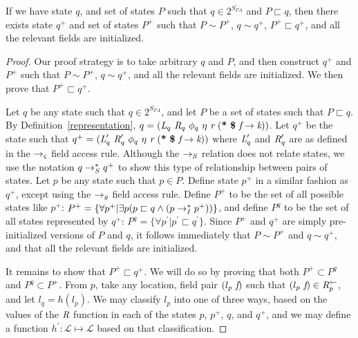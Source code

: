 \begin{lemma}
\label{lem:init}
If we have state $q$, and set of states $P$ such that $q \in 2^{S_\mathit{FA}}$ and $P \sqsubset q$, then there exists state $q^+$ and set of states $P^+$ such that $P \sim P^+$, $q \sim q^+$, $P^+ \sqsubset q^+$, and all the relevant fields are initialized.
\end{lemma}

\begin{proof}
Our proof strategy is to take arbitrary $q$ and $P$, and then construct $q^+$ and $P^+$ such that $P \sim P^+$, $q \sim q^+$, and all the relevant fields are initialized. We then prove that $P^+ \sqsubset q^+$.

Let $q$ be any state such that $q \in 2^{S_\mathit{FA}}$, and let $P$ be a set of states such that $P \sqsubset q$. By Definition~\ref{representation}, $q = \lp \cfgnt{L}_q\ \cfgnt{R}_q\ \phi_q\ \eta\ \cfgnt{r}\ \lp \cfgt{*}\ \cfgt{\$}\ \cfgnt{f} \rightarrow \cfgnt{k}\rp \rp$. Let $q^+$ be the state such that $q^+ = \lp \cfgnt{L}_{q}^\prime\ \cfgnt{R}_{q}^\prime\ \phi_{q}\ \eta\ \cfgnt{r}\ \lp \cfgt{*}\ \cfgt{\$}\ \cfgnt{f} \rightarrow \cfgnt{k}\rp \rp$ where $\emph{L}_{q}^\prime$ and  $\emph{R}_{q}^\prime$ are as defined in the $\rightarrow_{\varsigma}$ field access rule. Although the $\rightarrow_S$ relation does not relate states, we use the notation ${q} \rightarrow_S^* q^+$ to show this type of relationship between pairs of states. Let $p$ be any state such that $p \in P$. Define state $p^+$ in a similar fashion as $q^+$, except using the $\rightarrow_{g}$ field access rule. Define $P^+$ to be the set of all possible states like $p^+$: $P^+ = \{\forall {p}^+ | \exists {p} ({p} \sqsubset {q} \wedge ({p} \rightarrow_I^* {p}^+) ) \}$, and define $P^{q}$ to be the set of all states represented by $q^+$: $P^{q} = \{\forall {p}^\prime | {p}^\prime \sqsubset {q}^\prime \}$. Since $P^+$ and $q^+$ are simply pre-initialized versions of $P$ and $q$, it follows immediately that $P \sim P^+$ and $q \sim q^+$, and that all the relevant fields are initialized.

It remains to show that $P^+ \sqsubset q^+$. We will do so by proving that both $P^+ \subset P^q$ and $P^q \subset P^+$. From $p$, take any location, field pair $( l_p\  \emph{f})$ such that $( l_p\  \emph{f}) \in \emph{R}_{p}^\leftarrow$, and let $l_q = h(l_p)$. We may classify $l_p$ into one of three ways, based on the values of the $\emph{R}$ function in each of the states $p$, $p^+$, $q$, and $q^+$, and we may define a function $h^\prime: \mathcal{L} \mapsto \mathcal{L}$ based on that classification.


\end{proof}
